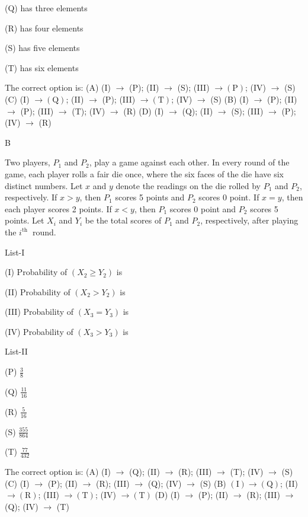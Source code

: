 (Q) has three elements

(R) has four elements

(S) has five elements

(T) has six elements

The correct option is:
(A) (I) $\rightarrow$ (P); (II) $\rightarrow$ (S); (III) $\rightarrow(\mathrm{P})$; (IV) $\rightarrow$ (S)
(C) (I) $\rightarrow(\mathrm{Q})$; (II) $\rightarrow$ (P); (III) $\rightarrow(\mathrm{T})$; (IV) $\rightarrow$ (S)
(B) (I) $\rightarrow$ (P); (II) $\rightarrow$ (P); (III) $\rightarrow$ (T); (IV) $\rightarrow$ (R)
(D) (I) $\rightarrow$ (Q); (II) $\rightarrow$ (S); (III) $\rightarrow$ (P); (IV) $\rightarrow$ (R)

B

Two players, $P_{1}$ and $P_{2}$, play a game against each other. In every round of the game, each player rolls a fair die once, where the six faces of the die have six distinct numbers. Let $x$ and $y$ denote the readings on the die rolled by $P_{1}$ and $P_{2}$, respectively. If $x>y$, then $P_{1}$ scores 5 points and $P_{2}$ scores 0 point. If $x=y$, then each player scores 2 points. If $x<y$, then $P_{1}$ scores 0 point and $P_{2}$ scores 5 points. Let $X_{i}$ and $Y_{i}$ be the total scores of $P_{1}$ and $P_{2}$, respectively, after playing the $i^{\text {th }}$ round.

List-I

(I) Probability of $\left(X_{2} \geq Y_{2}\right)$ is

(II) Probability of $\left(X_{2}>Y_{2}\right)$ is

(III) Probability of $\left(X_{3}=Y_{3}\right)$ is

(IV) Probability of $\left(X_{3}>Y_{3}\right)$ is

List-II

(P) $\frac{3}{8}$

(Q) $\frac{11}{16}$

(R) $\frac{5}{16}$

(S) $\frac{355}{864}$

(T) $\frac{77}{432}$

The correct option is:
(A) (I) $\rightarrow$ (Q); (II) $\rightarrow$ (R); (III) $\rightarrow$ (T); (IV) $\rightarrow$ (S)
(C) (I) $\rightarrow$ (P); (II) $\rightarrow$ (R); (III) $\rightarrow$ (Q); (IV) $\rightarrow$ (S)
(B) $(\mathrm{I}) \rightarrow(\mathrm{Q})$; (II) $\rightarrow(\mathrm{R})$; (III) $\rightarrow(\mathrm{T})$; (IV) $\rightarrow(\mathrm{T})$
(D) (I) $\rightarrow$ (P); (II) $\rightarrow$ (R); (III) $\rightarrow$ (Q); (IV) $\rightarrow$ (T)


